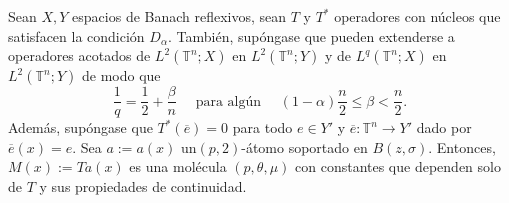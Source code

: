 \begin{lemma}
	Sean $X, Y$ espacios de Banach reflexivos, sean $T$ y  $T^*$ operadores con núcleos que satisfacen la condición $D_\alpha$. También, supóngase que pueden extenderse a operadores acotados de $L^2(\mathbb{T}^n;X)$ en $L^2(\mathbb{T}^n;Y)$ y de $L^q(\mathbb{T}^n;X)$ en $L^2(\mathbb{T}^n;Y)$ de modo que 
	\begin{equation}
		\frac{1}{q} = \frac{1}{2} + \frac{\beta}{n} \quad \text{ para algún } \quad (1-\alpha)\frac{n}{2}\leq \beta<\frac{n}{2}.
	\end{equation}
	Además, supóngase que $T^*(\overline{e})=0$ para todo ${e}\in Y'$ y $\overline{e}:\mathbb{T}^n\rightarrow Y'$ dado por $\overline{e}(x)=e$. Sea $a:=a(x)$ un$(p,2)$-átomo  soportado en $B(z,\sigma)$. Entonces, $M(x):=Ta(x)$ es una molécula $(p, \theta, \mu)$ con constantes que dependen solo de $T$ y sus propiedades de continuidad.
	\label{lem:Ta-is-molecule}
\end{lemma}

